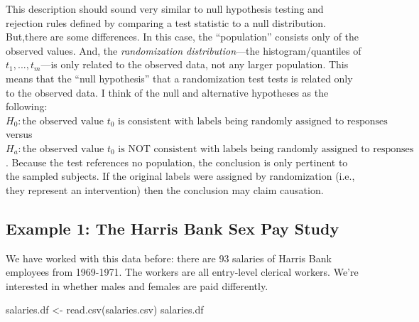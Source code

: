 \documentclass[
]{book}
\newenvironment{Shaded}{\begin{snugshade}}{\end{snugshade}}
\newcommand{\FunctionTok}[1]{\textcolor[rgb]{0.00,0.00,0.00}{#1}}
\newcommand{\NormalTok}[1]{#1}
\newcommand{\OtherTok}[1]{\textcolor[rgb]{0.56,0.35,0.01}{#1}}
\newcommand{\StringTok}[1]{\textcolor[rgb]{0.31,0.60,0.02}{#1}}
\begin{document}
This description should sound very similar to null hypothesis testing and rejection rules defined by comparing a test statistic to a null distribution. But,there are some differences. In this case, the ``population'' consists only of the observed values. And, the \emph{randomization distribution}---the histogram/quantiles of \(t_1, ..., t_m\)---is only related to the observed data, not any larger population. This means that the ``null hypothesis'' that a randomization test tests is related only to the observed data. I think of the null and alternative hypotheses as the following: \(H_0: \text{the observed value } t_0 \text{ is consistent with labels being randomly assigned to responses}\) versus \(H_a: \text{the observed value } t_0 \text{ is NOT consistent with labels being randomly assigned to responses}\). Because the test references no population, the conclusion is only pertinent to the sampled subjects. If the original labels were assigned by randomization (i.e., they represent an intervention) then the conclusion may claim causation.

\hypertarget{example-1-the-harris-bank-sex-pay-study}{%
\subsection{Example 1: The Harris Bank Sex Pay Study}\label{example-1-the-harris-bank-sex-pay-study}}

We have worked with this data before: there are 93 salaries of Harris Bank employees from 1969-1971. The workers are all entry-level clerical workers. We're interested in whether males and females are paid differently.

\begin{Shaded}
\begin{Highlighting}[]
\NormalTok{salaries.df }\OtherTok{\textless{}{-}} \FunctionTok{read.csv}\NormalTok{(}\StringTok{\textquotesingle{}salaries.csv\textquotesingle{}}\NormalTok{)}
\NormalTok{salaries.df}
\end{Highlighting}
\end{Shaded}
\end{document}
